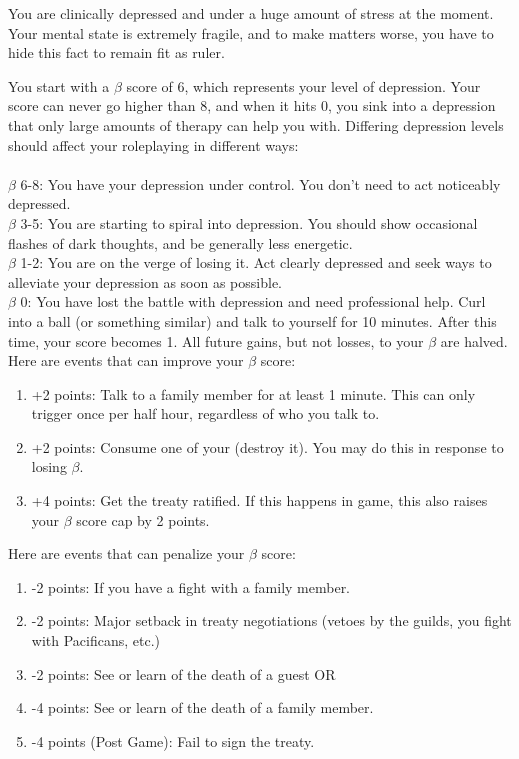 \documentclass[green]{NeptuneBall}
\begin{document}
\name{\gDepression{}}

You are clinically depressed and under a huge amount of stress at the moment. Your mental state is extremely fragile, and to make matters worse, you have to hide this fact to remain fit as ruler.

You start with a $\beta$ score of 6, which represents your level of depression. Your score can never go higher than 8, and when it hits 0, you sink into a depression that only large amounts of therapy can help you with. Differing depression levels should affect your roleplaying in different ways: \\ \\
$\beta$ 6-8: You have your depression under control. You don't need to act noticeably depressed. \\
$\beta$ 3-5: You are starting to spiral into depression. You should show occasional flashes of dark thoughts, and be generally less energetic. \\
$\beta$ 1-2: You are on the verge of losing it. Act clearly depressed and seek ways to alleviate your depression as soon as possible. \\
$\beta$ 0: You have lost the battle with depression and need professional help. Curl into a ball (or something similar) and talk to yourself for 10 minutes. After this time, your score becomes 1. All future gains, but not losses, to your $\beta$ are halved. \\

Here are events that can improve your $\beta$ score: 

\begin{enumerate}
\item +2 points: Talk to a family member for at least 1 minute. This can only trigger once per half hour, regardless of who you talk to.
\item +2 points: Consume one of your \iTablets{} (destroy it). You may do this in response to losing $\beta$.
\item +4 points: Get the treaty ratified. If this happens in game, this also raises your $\beta$ score cap by 2 points.
\end{enumerate}

Here are events that can penalize your $\beta$ score:

\begin{enumerate}
\item -2 points: If you have a fight with a family member.
\item -2 points: Major setback in treaty negotiations (vetoes by the guilds, you fight with Pacificans, etc.)
\item -2 points: See or learn of the death of a guest OR
\item -4 points: See or learn of the death of a family member.
\item -4 points (Post Game): Fail to sign the treaty.
\end{enumerate}
\end{document}
